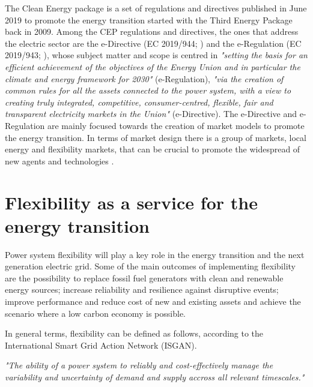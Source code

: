 The Clean Energy package is a set of regulations and directives published in June 2019 to promote the energy transition started with the Third Energy Package back in 2009. Among the CEP regulations and directives, the ones that address the electric sector are the e-Directive (EC 2019/944; \cite{Directive2019944}) and the e-Regulation (EC 2019/943; \cite{Directive2019943}), whose subject matter and scope is centred in \textit{"setting the basis for an efficient achievement of the objectives of the Energy Union and in particular the climate and energy framework for 2030"} (e-Regulation), \textit{"via the creation of common rules for all the assets connected to the power system, with a view to creating truly integrated, competitive, consumer-centred, flexible, fair and transparent electricity markets in the Union"} (e-Directive). The e-Directive and e-Regulation are mainly focused towards the creation of market models to
promote the energy transition. In terms of market design there is a group of markets, local energy and flexibility markets, that can be crucial to promote the widespread of new agents and technologies \cite{Xu2019}.


\section{Flexibility as a service for the energy transition}
Power system flexibility will play a key role in the energy transition and the next generation electric grid. Some of the main outcomes of implementing flexibility are the possibility to replace fossil fuel generators with clean and renewable energy sources; increase reliability and resilience against disruptive events; improve performance and reduce cost of new and existing assets and achieve the scenario where a low carbon economy is possible. 

In general terms, flexibility can be defined as follows, according to the International Smart Grid Action Network (ISGAN)\cite{Hillberg2019}.
\vspace*{3mm}
\begin{tcolorbox}
\textit{"The ability of a power system to reliably and cost-effectively manage the variability and uncertainty of demand and supply accross all relevant timescales."}
\end{tcolorbox} 
\vspace*{3mm}


